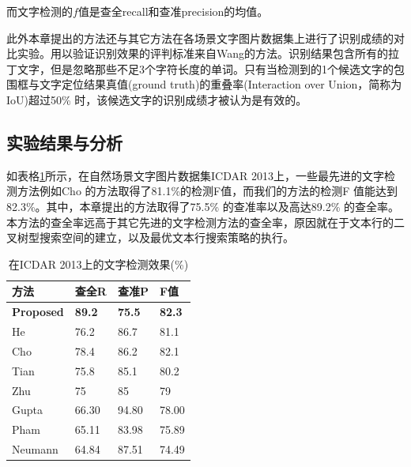         而文字检测的$f$值是查全recall和查准precision的均值。

        此外本章提出的方法还与其它方法在各场景文字图片数据集上进行了识别成绩的对比实验。用以验证识别效果的评判标准来自Wang\cite{Wang2012End}的方法。识别结果包含所有的拉丁文字，但是忽略那些不足3个字符长度的单词。只有当检测到的1个候选文字的包围框与文字定位结果真值(ground truth)的重叠率(Interaction over Union，简称为IoU)超过50\% 时，该候选文字的识别成绩才被认为是有效的。

        \subsection{实验结果与分析}

        如表格\ref{tab.c4_icdar13}所示，在自然场景文字图片数据集ICDAR 2013上，一些最先进的文字检测方法例如Cho\cite{Cho2016Canny} 的方法取得了81.1\%的检测F值，而我们的方法的检测F 值能达到82.3\%。其中，本章提出的方法取得了75.5\% 的查准率以及高达89.2\% 的查全率。本方法的查全率远高于其它先进的文字检测方法的查全率，原因就在于文本行的二叉树型搜索空间的建立，以及最优文本行搜索策略的执行。

        \begin{table}[!h]
        \centering
        \caption{在ICDAR 2013上的文字检测效果(\%)}
        \begin{tabular}{p{}|p{} p{} p{}}
        \hline
        方法 & 查全R & 查准P & F值 \\
        \hline
        \textbf{Proposed} & \textbf{89.2} & \textbf{75.5} & \textbf{82.3}\\
        He\cite{He2017scene} & 76.2 & 86.7 & 81.1 \\
        Cho\cite{Cho2016Canny} & 78.4 & 86.2 & 82.1 \\
        Tian\cite{Tian2016Text} & 75.8 & 85.1 & 80.2 \\
        Zhu\cite{Zhu2016Text} & 75 & 85 & 79 \\
        Gupta\cite{Gupta2016Synthetic} & 66.30 & 94.80 & 78.00 \\
        Pham\cite{Pham2016Robust} & 65.11 & 83.98 & 75.89 \\
        Neumann\cite{Neumann2012Real} & 64.84 & 87.51 & 74.49 \\
        \hline
        \end{tabular}
        \label{tab.c4_icdar13}
        \end{table}

